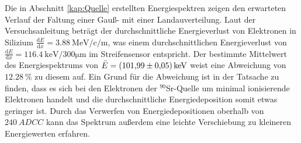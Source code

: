 Die in Abschnitt \ref{kap:Quelle} erstellten Energiespektren zeigen den erwarteten Verlauf der Faltung einer Gauß- mit einer Landauverteilung. Laut der Versuchsanleitung \cite{anleitung} beträgt der durchschnittliche Energieverlust von Elektronen in Silizium $\frac{\mathrm{d}E}{\mathrm{d}x} = \SI{3.88}{\mega\electronvolt\per\centi \per \metre}$, was einem durchschnittlichen Energieverlust von $\frac{\mathrm{d}E}{\mathrm{d}x} = \SI{116.4}{\kilo\electronvolt\per 300 \micro \metre}$ im Streifensensor entspricht. Der bestimmte Mittelwert des Energiespektrums von $\bar{E} = \SI{101.99 \pm 0.05}{\kilo\electronvolt}$ weist eine Abweichung von $\SI{12.28}{\%}$ zu diesem auf. Ein Grund für die Abweichung ist in der Tatsache zu finden, dass es sich bei den Elektronen der $^{90}$Sr-Quelle um minimal ionisierende Elektronen handelt und die durchschnittliche Energiedeposition somit etwas geringer ist. Durch das Verwerfen von Energiedepositionen oberhalb von $\SI{240}{ADCC}$ kann das Spektrum außerdem eine leichte Verschiebung zu kleineren Energiewerten erfahren.
